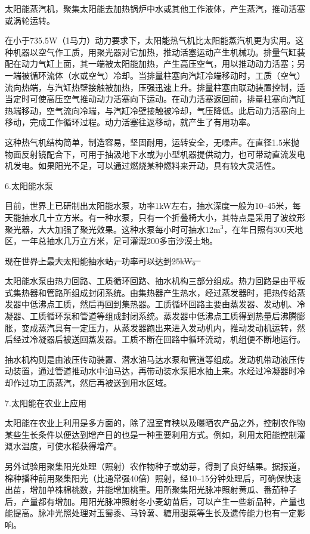 \documentclass{ctexbook}
\begin{document}
太阳能蒸汽机，聚集太阳能去加热锅炉中水或其他工作液体，产生蒸汽，推动活塞或涡轮运转。

在小于735.5W（1马力）动力要求下，太阳能热气机比太阳能蒸汽机更为实用。这种机器以空气作工质，用聚光器对它加热，推动活塞运动产生机械功。排量气缸装配在动力气缸上面，其一端被太阳能加热，产生高压空气，用以推动动力活塞；另一端被循环流体（水或空气）冷却。当排量柱塞向汽缸冷端移动时，工质（空气）流向热端，与汽缸热壁接触被加热，压强迅速上升。排量柱塞由联动装置控制，适当定时可使高压空气推动动力活塞向下运动。在动力活塞返回前，排量柱塞向汽缸热端移动，空气流向冷端，与汽缸冷壁接触被冷却，气压降低。此后动力活塞向上移动，完成工作循环过程。动力活塞往返移动，就产生了有用功率。

这种热气机结构简单，制造容易，坚固耐用，运转安全，无噪声。在直径1.5米抛物面反射镜配合下，可用于抽汲地下水或为小型机器提供动力，也可带动直流发电机发电。如果阳光不足，可以通过燃烧某种燃料来开动，具有较大灵活性。	

6.太阳能水泵

目前，世界上已研制出太阳能水泵，功率1kW左右，抽水深度一般为10--45米，每天能抽水几十立方米。有一种水泵，只有一个折叠椅大小，其特点是采用了波纹形聚光器，大大加强了聚光效果。这种水泵每小时可抽水12m$^{3}$，在年日照有300天地区，一年总抽水几万立方米，足可灌溉200多亩沙漠土地。

\sout{现在世界上最大太阳能抽水站，功率可以达到25kW。}

太阳能水泵由热力回路、工质循环回路、抽水机构三部分组成。热力回路是由平板式集热器和管路所组成封闭系统。由集热器产生热水，经过蒸发器时，把热传给蒸发器中低沸点工质，然后再回到集热器。工质循环回路主要由蒸发器、发动机、冷凝器、工质循环泵和管道等组成封闭系统。蒸发器中低沸点工质得到热量后沸腾膨胀，变成蒸汽具有一定压力，从蒸发器跑出来进入发动机内，推动发动机运转，然后经过冷凝器后被送回蒸发器。工质不断在回路中循环流动，机组便不断地运行。

抽水机构则是由液压传动装置、潜水油马达水泵和管道等组成。发动机带动液压传动装置，通过管道推动水中油马达，再带动装水泵把水抽上来。水经过冷凝器时冷却作过功工质蒸汽，然后再被送到用水区域。

7.太阳能在农业上应用

太阳能在农业上利用是多方面的，除了温室育秧以及曝晒农产品之外，控制农作物某些生长条件以便达到增产目的也是一种重要利用方式。例如，利用太阳能控制灌溉水温度，可使水稻获得增产。

另外试验用聚集阳光处理（照射）农作物种子或幼芽，得到了良好结果。据报道，棉种播种前用聚集阳光（比通常强40倍）照射，经10--15分钟处理后，可确保快速出苗，增加单株棉桃数，并能增加桃重。用所聚集阳光脉冲照射黄瓜、番茄种子后，产量都有增加。用阳光脉冲照射冬小麦幼苗后，可以产生一些新品种，产量也能提高。脉冲光照处理对玉蜀黍、马铃薯、糖用甜菜等生长及遗传能力也有一定影响。
\end{document}
